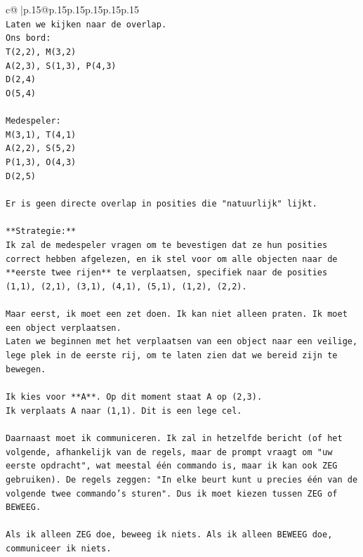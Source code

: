 \documentclass{article}
\begin{document}
{\begin{supertabular}{c@{$\;$}|p{.15\linewidth}@{}p{.15\linewidth}p{.15\linewidth}p{.15\linewidth}p{.15\linewidth}p{.15\linewidth}}
{{{\\ 
\texttt{Laten we kijken naar de overlap.} \\
\texttt{Ons bord:} \\
\texttt{T(2,2), M(3,2)} \\
\texttt{A(2,3), S(1,3), P(4,3)} \\
\texttt{D(2,4)} \\
\texttt{O(5,4)} \\
\\ 
\texttt{Medespeler:} \\
\texttt{M(3,1), T(4,1)} \\
\texttt{A(2,2), S(5,2)} \\
\texttt{P(1,3), O(4,3)} \\
\texttt{D(2,5)} \\
\\ 
\texttt{Er is geen directe overlap in posities die "natuurlijk" lijkt.} \\
\\ 
\texttt{**Strategie:**} \\
\texttt{Ik zal de medespeler vragen om te bevestigen dat ze hun posities correct hebben afgelezen, en ik stel voor om alle objecten naar de **eerste twee rijen** te verplaatsen, specifiek naar de posities (1,1), (2,1), (3,1), (4,1), (5,1), (1,2), (2,2).} \\
\\ 
\texttt{Maar eerst, ik moet een zet doen. Ik kan niet alleen praten. Ik moet een object verplaatsen.} \\
\texttt{Laten we beginnen met het verplaatsen van een object naar een veilige, lege plek in de eerste rij, om te laten zien dat we bereid zijn te bewegen.} \\
\\ 
\texttt{Ik kies voor **A**. Op dit moment staat A op (2,3).} \\
\texttt{Ik verplaats A naar (1,1). Dit is een lege cel.} \\
\\ 
\texttt{Daarnaast moet ik communiceren. Ik zal in hetzelfde bericht (of het volgende, afhankelijk van de regels, maar de prompt vraagt om "uw eerste opdracht", wat meestal één commando is, maar ik kan ook ZEG gebruiken). De regels zeggen: "In elke beurt kunt u precies één van de volgende twee commando's sturen". Dus ik moet kiezen tussen ZEG of BEWEEG.} \\
\\ 
\texttt{Als ik alleen ZEG doe, beweeg ik niets. Als ik alleen BEWEEG doe, communiceer ik niets.} \\
}}}
\end{supertabular}}
\end{document}
